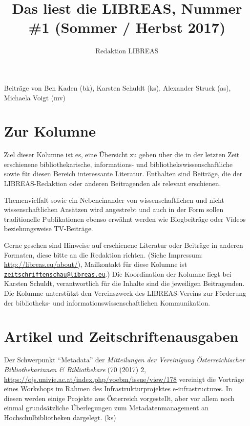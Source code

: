 \documentclass[a4paper,
fontsize=11pt,
oneside,
numbers=noperiodatend,
parskip=half-,
bibliography=totoc,
final
]{scrartcl}
\title{\LARGE{Das liest die LIBREAS, Nummer \#1 (Sommer / Herbst 2017)}} %
\author{Redaktion LIBREAS} %
\date{}
\begin{document}
\maketitle
\thispagestyle{fancyplain} 


Beiträge von Ben Kaden (bk), Karsten Schuldt (ks), Alexander Struck
(as), Michaela Voigt (mv)

\hypertarget{zur-kolumne}{%
\section*{Zur Kolumne}\label{zur-kolumne}}

Ziel dieser Kolumne ist es, eine Übersicht zu geben über die in der
letzten Zeit erschienene bibliothekarische, informations- und
bibliothekswissenschaftliche sowie für diesen Bereich interessante
Literatur. Enthalten sind Beiträge, die der LIBREAS-Redaktion oder
anderen Beitragenden als relevant erschienen.

Themenvielfalt sowie ein Nebeneinander von wissenschaftlichen und
nicht-wissenschaftlichen Ansätzen wird angestrebt und auch in der Form
sollen traditionelle Publikationen ebenso erwähnt werden wie
Blogbeiträge oder Videos beziehungsweise TV-Beiträge.

Gerne gesehen sind Hinweise auf erschienene Literatur oder Beiträge in
anderen Formaten, diese bitte an die Redaktion richten. (Siehe
Impressum: \url{http://libreas.eu/about/}), Mailkontakt für diese
Kolumne ist
\href{mailto:zeitschriftenschau@libreas.eu}{\nolinkurl{zeitschriftenschau@libreas.eu}}.)
Die Koordination der Kolumne liegt bei Karsten Schuldt, verantwortlich
für die Inhalte sind die jeweiligen Beitragenden. Die Kolumne
unterstützt den Vereinszweck des LIBREAS-Vereins zur Förderung der
bibliotheks- und informationswissenschaftlichen Kommunikation.

\hypertarget{artikel-und-zeitschriftenausgaben}{%
\section*{Artikel und
Zeitschriftenausgaben}\label{artikel-und-zeitschriftenausgaben}}

Der Schwerpunkt \enquote{Metadata} der \emph{Mitteilungen der
Vereinigung Österreichischer Bibliothekarinnen \& Bibliothekare} (70
(2017) 2, \url{https://ojs.univie.ac.at/index.php/voebm/issue/view/178}
vereinigt die Vorträge eines Workshops im Rahmen des
Infrastrukturprojektes e-infrastructures. In diesen werden einige
Projekte aus Österreich vorgestellt, aber vor allem noch einmal
grundsätzliche Überlegungen zum Metadatenmanagement an
Hochschulbibliotheken dargelegt. (ks)
\end{document}
